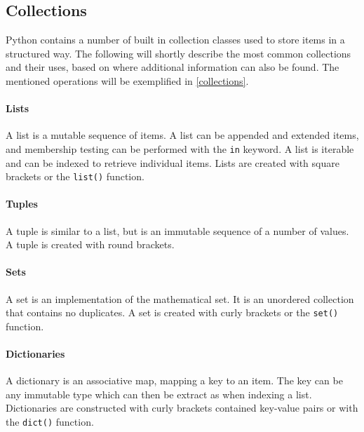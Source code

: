 \subsection{Collections}
Python contains a number of built in collection classes used to store items in a structured way.
The following will shortly describe the most common collections and their uses, based on \citet{python_datastructures} where additional information can also be found.
The mentioned operations will be exemplified in \cref{collections}.


\paragraph{Lists} A list is a mutable sequence of items.
A list can be appended and extended items, and membership testing can be performed with the \texttt{in} keyword.
A list is iterable and can be indexed to retrieve individual items.
Lists are created with square brackets or the \texttt{list()} function.

\paragraph{Tuples} A tuple is similar to a list, but is an immutable sequence of a number of values.
A tuple is created with round brackets.

\paragraph{Sets} A set is an implementation of the mathematical set.
It is an unordered collection that contains no duplicates.
A set is created with curly brackets or the \texttt{set()} function.

\paragraph{Dictionaries} A dictionary is an associative map, mapping a key to an item.
The key can be any immutable type which can then be extract as when indexing a list.
Dictionaries are constructed with curly brackets contained key-value pairs or with the \texttt{dict()} function.

